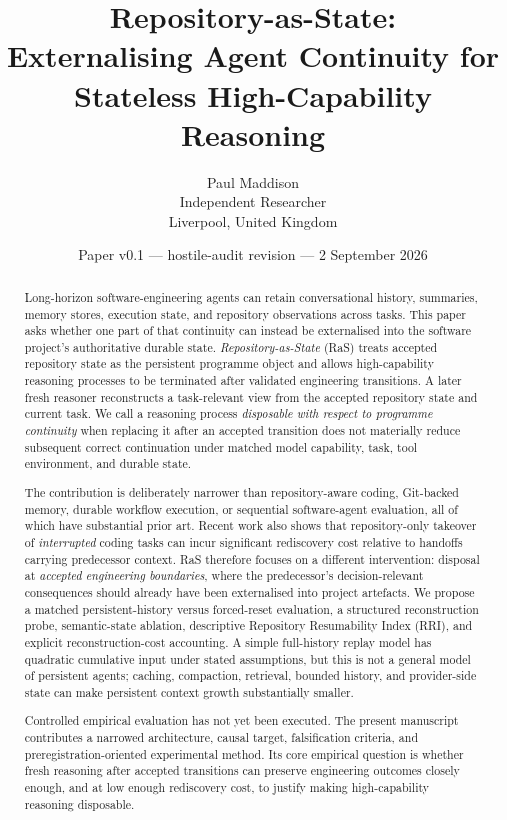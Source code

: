 \documentclass[11pt]{article}
\title{Repository-as-State:\\Externalising Agent Continuity for Stateless High-Capability Reasoning}
\author{Paul Maddison\\Independent Researcher\\Liverpool, United Kingdom}
\date{Paper v0.1 --- hostile-audit revision --- 2 September 2026}
\begin{document}
\maketitle

\begin{abstract}
Long-horizon software-engineering agents can retain conversational history, summaries, memory stores, execution state, and repository observations across tasks. This paper asks whether one part of that continuity can instead be externalised into the software project's authoritative durable state. \emph{Repository-as-State} (RaS) treats accepted repository state as the persistent programme object and allows high-capability reasoning processes to be terminated after validated engineering transitions. A later fresh reasoner reconstructs a task-relevant view from the accepted repository state and current task. We call a reasoning process \emph{disposable with respect to programme continuity} when replacing it after an accepted transition does not materially reduce subsequent correct continuation under matched model capability, task, tool environment, and durable state.

The contribution is deliberately narrower than repository-aware coding, Git-backed memory, durable workflow execution, or sequential software-agent evaluation, all of which have substantial prior art. Recent work also shows that repository-only takeover of \emph{interrupted} coding tasks can incur significant rediscovery cost relative to handoffs carrying predecessor context. RaS therefore focuses on a different intervention: disposal at \emph{accepted engineering boundaries}, where the predecessor's decision-relevant consequences should already have been externalised into project artefacts. We propose a matched persistent-history versus forced-reset evaluation, a structured reconstruction probe, semantic-state ablation, descriptive Repository Resumability Index (RRI), and explicit reconstruction-cost accounting. A simple full-history replay model has quadratic cumulative input under stated assumptions, but this is not a general model of persistent agents; caching, compaction, retrieval, bounded history, and provider-side state can make persistent context growth substantially smaller.

Controlled empirical evaluation has not yet been executed. The present manuscript contributes a narrowed architecture, causal target, falsification criteria, and preregistration-oriented experimental method. Its core empirical question is whether fresh reasoning after accepted transitions can preserve engineering outcomes closely enough, and at low enough rediscovery cost, to justify making high-capability reasoning disposable.
\end{abstract}
\end{document}
